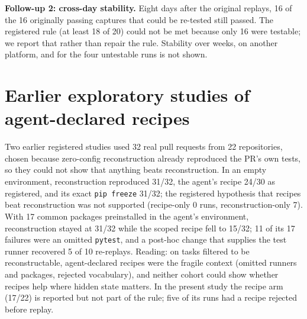\documentclass[10pt,conference]{IEEEtran}
\newcommand{\pip}{\texttt{pip freeze}}
\begin{document}
\textbf{Follow-up 2: cross-day stability.} Eight days after the original replays, 16 of the 16 originally passing captures that could be re-tested still passed. The registered rule (at least 18 of 20) could not be met because only 16 were testable; we report that rather than repair the rule. Stability over weeks, on another platform, and for the four untestable runs is not shown.

\section{Earlier exploratory studies of agent-declared recipes}
Two earlier registered studies used 32 real pull requests from 22 repositories, chosen because zero-config reconstruction already reproduced the PR's own tests, so they could not show that anything beats reconstruction. In an empty environment, reconstruction reproduced 31/32, the agent's recipe 24/30 as registered, and its exact \pip{} 31/32; the registered hypothesis that recipes beat reconstruction was not supported (recipe-only 0 runs, reconstruction-only 7). With 17 common packages preinstalled in the agent's environment, reconstruction stayed at 31/32 while the scoped recipe fell to 15/32; 11 of its 17 failures were an omitted \texttt{pytest}, and a post-hoc change that supplies the test runner recovered 5 of 10 re-replays. Reading: on tasks filtered to be reconstructable, agent-declared recipes were the fragile context (omitted runners and packages, rejected vocabulary), and neither cohort could show whether recipes help where hidden state matters. In the present study the recipe arm (17/22) is reported but not part of the rule; five of its runs had a recipe rejected before replay.
\end{document}
